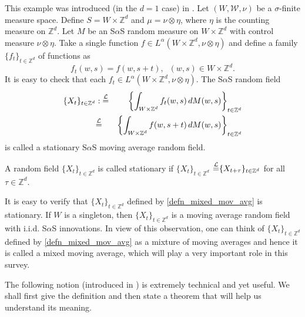 \documentclass[12pt]{amsart}
\begin{document}
\begin{example}\label{example_mixed_mov_avg}  \textnormal{This example was introduced (in the $d=1$ case) in \cite{surgailis:rosinski:mandrekar:cambanis:1993}. Let $(W, \mathcal{W}, \nu)$ be a $\sigma$-finite measure space. Define $S=W \times {\mathbb{Z}^d}$ and $\mu=\nu \otimes \eta$, where $\eta$ is the counting measure on ${\mathbb{Z}^d}$. Let $M$ be an S$\alpha$S random measure on $W \times {\mathbb{Z}^d}$ with control measure $\nu \otimes \eta$. Take a single function $f \in L^\alpha(W \times {\mathbb{Z}^d}, \nu \otimes \eta)$ and define a family $\{f_t\}_{t \in \mathbb{Z}^d}$ of functions as}
\[
f_t(w, s)=f(w, s+t), \; \;(w,s) \in W \times {\mathbb{Z}^d}.
\]
\textnormal{It is easy to check that each $f_t \in L^\alpha(W \times {\mathbb{Z}^d}, \nu \otimes \eta)$. The S$\alpha$S random field}
\begin{eqnarray}
{\{X_t\}_{t \in \mathbb{Z}^d}}&:{\stackrel{\footnotesize{\mathcal{L}}}{=}}& \left\{\int_{W \times {\mathbb{Z}^d}} f_t(w,s) \,dM(w,s)\right\}_{t \in {\mathbb{Z}^d}} \nonumber\\
          &{\stackrel{\footnotesize{\mathcal{L}}}{=}}& \left\{\int_{W \times {\mathbb{Z}^d}} f(w,s+t) \,dM(w,s)\right\}_{t \in {\mathbb{Z}^d}} \label{defn_mixed_mov_avg}
\end{eqnarray}
\textnormal{is called a stationary S$\alpha$S moving average random field.}
\end{example}
\begin{defn} \label{defn_stationary}A random field ${\{X_t\}_{t \in \mathbb{Z}^d}}$ is called stationary if ${\{X_t\}_{t \in \mathbb{Z}^d}}$ ${\stackrel{\footnotesize{\mathcal{L}}}{=}} \{X_{t+\tau}\}_{t \in {\mathbb{Z}^d}}$ for all $\tau \in {\mathbb{Z}^d}$.
\end{defn}

It is easy to verify that ${\{X_t\}_{t \in \mathbb{Z}^d}}$ defined by \eqref{defn_mixed_mov_avg} is stationary. If $W$ is a singleton, then ${\{X_t\}_{t \in \mathbb{Z}^d}}$ is a moving average random field with i.i.d. S$\alpha$S innovations. In view of this observation, one can think of ${\{X_t\}_{t \in \mathbb{Z}^d}}$ defined by \eqref{defn_mixed_mov_avg} as a mixture of moving averages and hence it is called a mixed moving average, which will play a very important role in this survey.

The following notion (introduced in \cite{hardin:1982b}) is extremely technical and yet useful. We shall first give the definition and then state a theorem that will help us understand its meaning.
\end{document}
